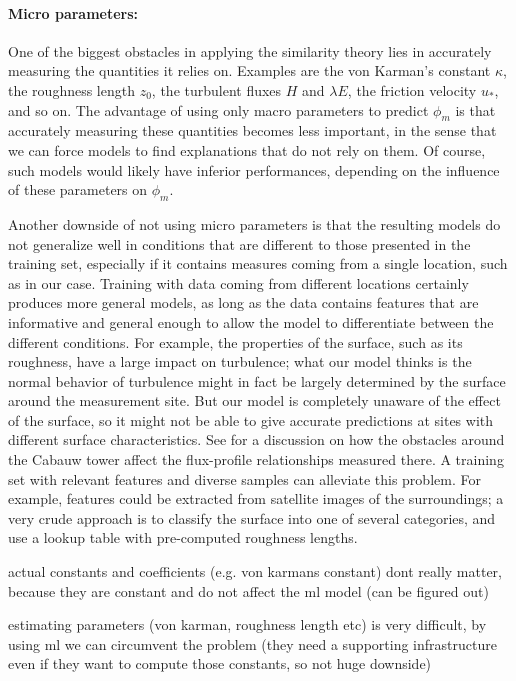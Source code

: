 \documentclass[a4paper]{book}
\begin{document}
\paragraph{Micro parameters:} One of the biggest obstacles in applying the similarity theory lies in accurately measuring the quantities it relies on. Examples are the von Karman's constant $\kappa$, the roughness length $z_0$, the turbulent fluxes $H$ and $\lambda E$, the friction velocity $u_*$, and so on. The advantage of using only macro parameters to predict $\phi_m$ is that accurately measuring these quantities becomes less important, in the sense that we can force models to find explanations that do not rely on them. Of course, such models would likely have inferior performances, depending on the influence of these parameters on $\phi_m$.

Another downside of not using micro parameters is that the resulting models do not generalize well in conditions that are different to those presented in the training set, especially if it contains measures coming from a single location, such as in our case. Training with data coming from different locations certainly produces more general models, as long as the data contains features that are informative and general enough to allow the model to differentiate between the different conditions. For example, the properties of the surface, such as its roughness, have a large impact on turbulence; what our model thinks is the normal behavior of turbulence might in fact be largely determined by the surface around the measurement site. But our model is completely unaware of the effect of the surface, so it might not be able to give accurate predictions at sites with different surface characteristics. See \cite{cabauw_surface} for a discussion on how the obstacles around the Cabauw tower affect the flux-profile relationships measured there. A training set with relevant features and diverse samples can alleviate this problem. For example, features could be extracted from satellite images of the surroundings; a very crude approach is to classify the surface into one of several categories, and use a lookup table with pre-computed roughness lengths.

actual constants and coefficients (e.g. von karmans constant) dont really matter, because they are constant and do not affect the ml model (can be figured out)

estimating parameters (von karman, roughness length etc) is very difficult, by using ml we can circumvent the problem (they need a supporting infrastructure even if they want to compute those constants, so not huge downside)
\end{document}
